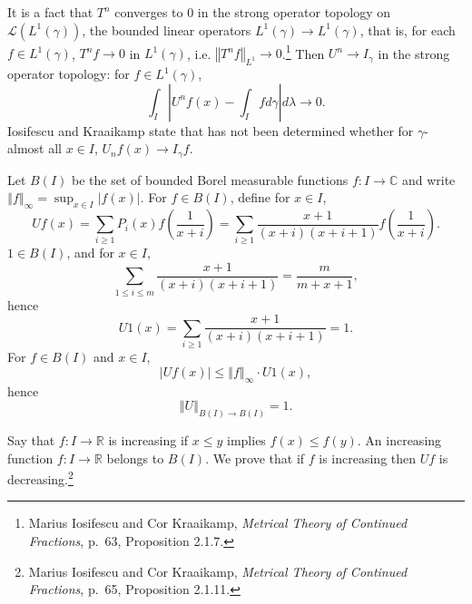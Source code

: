\documentclass{article}
\newcommand{\norm}[1]{\left\Vert #1 \right\Vert}
\theoremstyle{definition}
\begin{document}
It is a fact that $T^n$ converges to $0$ in the strong operator topology on $\mathscr{L}(L^1(\gamma))$, the bounded linear operators
$L^1(\gamma) \to L^1(\gamma)$, that is,
for each $f \in L^1(\gamma)$, $T^n f \to 0$ in $L^1(\gamma)$, i.e.
$\norm{T^n f}_{L^1} \to 0$.\footnote{Marius Iosifescu and Cor Kraaikamp,
{\em Metrical Theory of Continued Fractions}, p.~63, Proposition 2.1.7.}
Then $U^n \to I_\gamma$ in the strong operator topology: for $f \in L^1(\gamma)$,
\[
\int_I \left| U^n f(x) - \int_I f d\gamma \right| d\lambda \to 0.
\]
Iosifescu and Kraaikamp state that has not been determined whether for $\gamma$-almost all $x \in I$,
$U_n f (x) \to I_\gamma f$. 


Let $B(I)$ be the set of bounded Borel measurable functions $f:I \to \mathbb{C}$ and write $\norm{f}_\infty = \sup_{x \in I} |f(x)|$.
For $f \in B(I)$, define for $x \in I$,
\[
U f(x) = \sum_{i \geq 1} P_i(x) f\left(\frac{1}{x+i}\right)
= \sum_{i \geq 1} \frac{x+1}{(x+i)(x+i+1)} f\left(\frac{1}{x+i}\right).
\]
$1 \in B(I)$, and
for $x \in I$,
\[
\sum_{1 \leq i \leq m}  \frac{x+1}{(x+i)(x+i+1)} = \frac{m}{m+x+1},
\]
hence
\[
U1(x) = \sum_{i \geq 1}  \frac{x+1}{(x+i)(x+i+1)} = 1.
\]
For $f \in B(I)$ and $x \in I$,
\[
|Uf(x)| \leq \norm{f}_\infty \cdot U1(x),
\]
hence
\[
\norm{U}_{B(I) \to B(I)} = 1.
\]

Say that $f:I \to \mathbb{R}$ is increasing if $x \leq y$ implies $f(x) \leq f(y)$. 
An increasing function $f:I \to \mathbb{R}$ belongs to $B(I)$. We prove that 
if $f$ is increasing then $Uf$ is decreasing.\footnote{Marius Iosifescu and Cor Kraaikamp,
{\em Metrical Theory of Continued Fractions}, p.~65, Proposition 2.1.11.}
\end{document}
